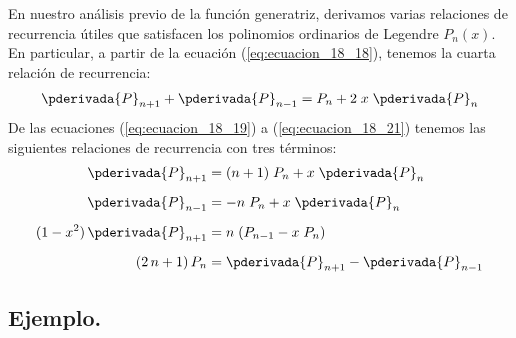 En nuestro análisis previo de la función generatriz, derivamos varias relaciones de recurrencia útiles que satisfacen los polinomios ordinarios de Legendre $P_{n} (x)$. En particular, a partir de la ecuación (\ref{eq:ecuacion_18_18}), tenemos la cuarta relación de recurrencia:
\begin{align*}
\pderivada{P}_{n+1} + \pderivada{P}_{n-1} =  P_{n} + 2 \; x \; \pderivada{P}_{n}
\end{align*}
De las ecuaciones (\ref{eq:ecuacion_18_19}) a (\ref{eq:ecuacion_18_21}) tenemos las siguientes relaciones de recurrencia con tres términos:
\begin{align*}
\pderivada{P}_{n+1} &= (n+1) \; P_{n} + x \; \pderivada{P}_{n} \\[0.5em]
\pderivada{P}_{n-1} &= -n \; P_{n} + x \; \pderivada{P}_{n} \\[0.5em]
(1 - x^{2}) \, \pderivada{P}_{n+1} &= n \; (P_{n-1} - x \; P_{n}) \\[0.5em]
(2 \, n + 1) \, P_{n} &= \pderivada{P}_{n+1} - \pderivada{P}_{n-1}
\end{align*}

\subsection{Ejemplo.}

